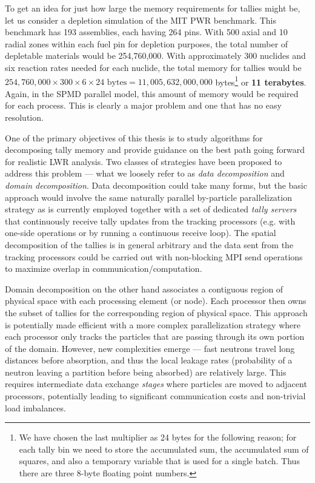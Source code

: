To get an idea for just how large the memory requirements for tallies might be,
let us consider a depletion simulation of the MIT PWR benchmark. This benchmark
has 193 assemblies, each having 264 pins. With 500 axial and 10 radial zones
within each fuel pin for depletion purposes, the total number of depletable
materials would be 254,760,000. With approximately 300 nuclides and six reaction
rates needed for each nuclide, the total memory for tallies would be
$254,760,000 \times 300 \times 6 \times 24 \text{ bytes} = 11,005,632,000,000$
bytes\footnote{We have chosen the last multiplier as 24 bytes for the following
  reason; for each tally bin we need to store the accumulated sum, the
  accumulated sum of squares, and also a temporary variable that is used for a
  single batch. Thus there are three 8-byte floating point numbers.} or
\textbf{11 terabytes}. Again, in the SPMD parallel model, this amount of memory
would be required for each process. This is clearly a major problem and one that
has no easy resolution.

One of the primary objectives of this thesis is to study algorithms for
decomposing tally memory and provide guidance on the best path going forward for
realistic LWR analysis. Two classes of strategies have been proposed to address
this problem --- what we loosely refer to as \emph{data decomposition} and
\emph{domain decomposition}. Data decomposition could take many forms, but the
basic approach would involve the same naturally parallel by-particle
parallelization strategy as is currently employed together with a set of
dedicated \emph{tally servers} that continuously receive tally updates from the
tracking processors (e.g. with one-side operations or by running a continuous
receive loop). The spatial decomposition of the tallies is in general arbitrary
and the data sent from the tracking processors could be carried out with
non-blocking MPI send operations to maximize overlap in
communication/computation.

Domain decomposition on the other hand associates a contiguous region of
physical space with each processing element (or node). Each processor then owns
the subset of tallies for the corresponding region of physical space. This
approach is potentially made efficient with a more complex parallelization
strategy where each processor only tracks the particles that are passing through
its own portion of the domain.  However, new complexities emerge --- fast
neutrons travel long distances before absorption, and thus the local leakage
rates (probability of a neutron leaving a partition before being absorbed) are
relatively large. This requires intermediate data exchange \emph{stages} where
particles are moved to adjacent processors, potentially leading to significant
communication costs and non-trivial load imbalances.


